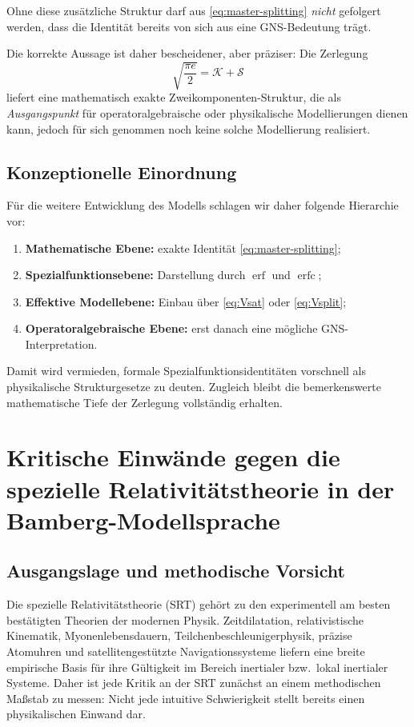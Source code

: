 \documentclass[12pt,a4paper]{article}
\begin{document}
	Ohne diese zusätzliche Struktur darf aus \eqref{eq:master-splitting} \emph{nicht} gefolgert werden, dass die Identität bereits von sich aus eine GNS-Bedeutung trägt.
	
	\begin{remark}
		Die korrekte Aussage ist daher bescheidener, aber präziser: Die Zerlegung
		\[
		\sqrt{\frac{\pi e}{2}}=\mathcal K+\mathcal S
		\]
		liefert eine mathematisch exakte Zweikomponenten-Struktur, die als \emph{Ausgangspunkt} für operatoralgebraische oder physikalische Modellierungen dienen kann, jedoch für sich genommen noch keine solche Modellierung realisiert.
	\end{remark}
	
	\subsection{Konzeptionelle Einordnung}
	
	Für die weitere Entwicklung des Modells schlagen wir daher folgende Hierarchie vor:
	\begin{enumerate}
		\item \textbf{Mathematische Ebene:} exakte Identität \eqref{eq:master-splitting};
		\item \textbf{Spezialfunktionsebene:} Darstellung durch \(\operatorname{erf}\) und \(\operatorname{erfc}\);
		\item \textbf{Effektive Modellebene:} Einbau über \eqref{eq:Vsat} oder \eqref{eq:Vsplit};
		\item \textbf{Operatoralgebraische Ebene:} erst danach eine mögliche GNS-Interpretation.
	\end{enumerate}
	
	Damit wird vermieden, formale Spezialfunktionsidentitäten vorschnell als physikalische Strukturgesetze zu deuten. Zugleich bleibt die bemerkenswerte mathematische Tiefe der Zerlegung vollständig erhalten.
	
	\section{Kritische Einwände gegen die spezielle Relativitätstheorie in der Bamberg-Modellsprache}
	
	\subsection{Ausgangslage und methodische Vorsicht}
	
	Die spezielle Relativitätstheorie (SRT) gehört zu den experimentell am besten bestätigten Theorien der modernen Physik. Zeitdilatation, relativistische Kinematik, Myonenlebensdauern, Teilchenbeschleunigerphysik, präzise Atomuhren und satellitengestützte Navigationssysteme liefern eine breite empirische Basis für ihre Gültigkeit im Bereich inertialer bzw.\ lokal inertialer Systeme. Daher ist jede Kritik an der SRT zunächst an einem methodischen Maßstab zu messen: Nicht jede intuitive Schwierigkeit stellt bereits einen physikalischen Einwand dar.
	
\end{document}
